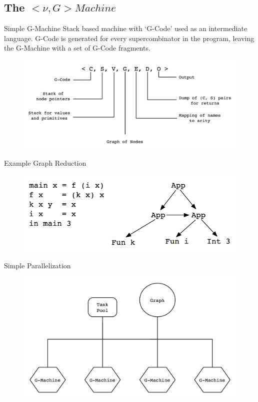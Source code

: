 \documentclass{beamer}
\begin{document}
\subsection[The $< \nu, G> Machine$]{The $< \nu, G> Machine$}

\begin{frame}{Simple G-Machine}
Stack based machine with `G-Code' used as an intermediate language. G-Code is generated for
every supercombinator in the program, leaving the G-Machine with a set of G-Code fragments.  
    \begin{figure}
    \centering
        \includegraphics[scale=.3]{figures/GMachineState.png}
    \end{figure}
\end{frame}

\begin{frame}{Example Graph Reduction}
    \begin{figure}
    \centering
        \includegraphics[scale=.3]{figures/GraphRed1.png}
    \end{figure}
\end{frame}

\begin{frame}{Simple Parallelization}
    \begin{figure}
    \centering
        \includegraphics[scale=.3]{figures/simpleParallel.png}
    \end{figure}
\end{frame}
\end{document}
